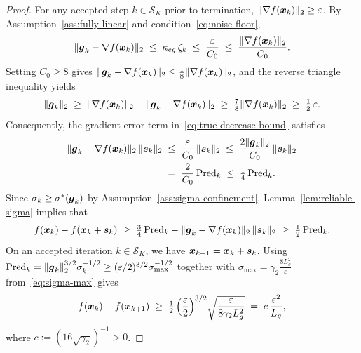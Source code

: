 \begin{proof}
For any accepted step $k \in \mathcal{S}_K$ prior to termination, $\|\nabla f(\boldsymbol{x}_k)\|_2 \ge \varepsilon$. By Assumption~\ref{ass:fully-linear} and condition~\eqref{eq:noise-floor},
\[
  \|\boldsymbol{g}_k - \nabla f(\boldsymbol{x}_k)\|_2 \;\le\; \kappa_{eg}\,\zeta_k \;\le\; \frac{\varepsilon}{C_0} \;\le\; \frac{\|\nabla f(\boldsymbol{x}_k)\|_2}{C_0}.
\]
Setting $C_0 \ge 8$ gives $\|\boldsymbol{g}_k - \nabla f(\boldsymbol{x}_k)\|_2 \le \tfrac{1}{8}\|\nabla f(\boldsymbol{x}_k)\|_2$, and the reverse triangle inequality yields
\[
  \|\boldsymbol{g}_k\|_2 \;\ge\; \|\nabla f(\boldsymbol{x}_k)\|_2 - \|\boldsymbol{g}_k - \nabla f(\boldsymbol{x}_k)\|_2 \;\ge\; \tfrac{7}{8}\|\nabla f(\boldsymbol{x}_k)\|_2 \;\ge\; \tfrac{1}{2}\,\varepsilon.
\]
Consequently, the gradient error term in~\eqref{eq:true-decrease-bound} satisfies
\begin{align*}
  \|\boldsymbol{g}_k - \nabla f(\boldsymbol{x}_k)\|_2\,\|\boldsymbol{s}_k\|_2
  &\;\le\; \frac{\varepsilon}{C_0}\,\|\boldsymbol{s}_k\|_2
  \;\le\; \frac{2\|\boldsymbol{g}_k\|_2}{C_0}\,\|\boldsymbol{s}_k\|_2 \\
  &\;=\; \frac{2}{C_0}\,\mathrm{Pred}_k
  \;\le\; \tfrac{1}{4}\,\mathrm{Pred}_k.
\end{align*}
Since $\sigma_k \ge \sigma^*(\boldsymbol{g}_k)$ by Assumption~\ref{ass:sigma-confinement}, Lemma~\ref{lem:reliable-sigma} implies that
\[
  f(\boldsymbol{x}_k) - f(\boldsymbol{x}_k + \boldsymbol{s}_k)
  \;\ge\; \tfrac{3}{4}\,\mathrm{Pred}_k - \|\boldsymbol{g}_k - \nabla f(\boldsymbol{x}_k)\|_2\,\|\boldsymbol{s}_k\|_2
  \;\ge\; \tfrac{1}{2}\,\mathrm{Pred}_k.
\]
On an accepted iteration $k \in \mathcal{S}_K$, we have $\boldsymbol{x}_{k+1} = \boldsymbol{x}_k + \boldsymbol{s}_k$. Using $\mathrm{Pred}_k = \|\boldsymbol{g}_k\|_2^{3/2} \sigma_k^{-1/2} \ge (\varepsilon/2)^{3/2} \sigma_{\max}^{-1/2}$ together with $\sigma_{\max} = \gamma_2 \frac{8L_g^2}{\varepsilon}$ from~\eqref{eq:sigma-max} gives
\begin{equation}\label{eq:per-step-descent}
  f(\boldsymbol{x}_k) - f(\boldsymbol{x}_{k+1})
  \;\ge\;
  \tfrac{1}{2}\,\Bigl(\frac{\varepsilon}{2}\Bigr)^{3/2} \sqrt{\frac{\varepsilon}{8\gamma_2 L_g^2}}
  \;=\;
  c\,\frac{\varepsilon^2}{L_g},
\end{equation}
where $c := (16\sqrt{\gamma_2})^{-1} > 0$.


\end{proof}
